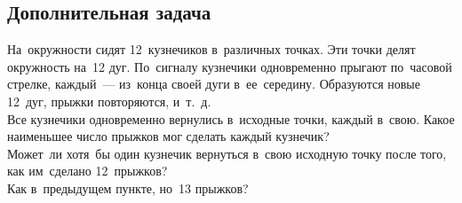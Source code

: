 

\subsection*{Дополнительная задача}



\begin{problems}

\item
На~окружности сидят 12~кузнечиков в~различных точках.
Эти точки делят окружность на~12 дуг.
По~сигналу кузнечики одновременно прыгают по~часовой стрелке, каждый~—
из~конца своей дуги в~ее~середину.
Образуются новые 12~дуг, прыжки повторяются, и~т.~д.
\\
\subproblem
Все кузнечики одновременно вернулись в~исходные точки, каждый в~свою.
Какое наименьшее число прыжков мог сделать каждый кузнечик?
\\
\subproblem
Может~ли хотя~бы один кузнечик вернуться в~свою исходную точку после того, как
им~сделано 12~прыжков?
\\
\subproblem
Как в~предыдущем пункте, но~13 прыжков?

\end{problems}

